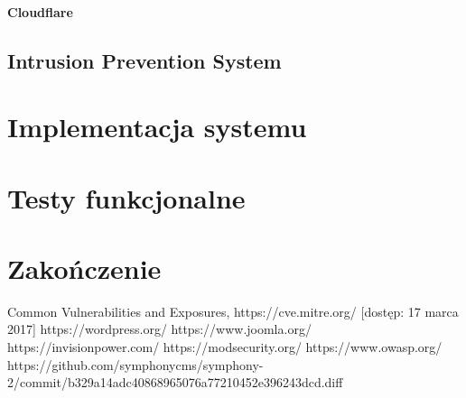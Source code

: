 \documentclass[11pt,a4paper,polish,thesis,oneside]{dcsbook}
\begin{document}
\subsubsection{Cloudflare}

\section{Intrusion Prevention System}

\chapter{Implementacja systemu}

\chapter{Testy funkcjonalne}


\chapter{Zakończenie}

\backmatter

\begin{thebibliography}{1}
 Common Vulnerabilities and Exposures, https://cve.mitre.org/ [dostęp: 17 marca 2017]
 https://wordpress.org/
 https://www.joomla.org/
 https://invisionpower.com/
 https://modsecurity.org/
 https://www.owasp.org/
 https://github.com/symphonycms/symphony-2/commit/b329a14adc40868965076a77210452e396243dcd.diff
\end{thebibliography}
\end{document}
